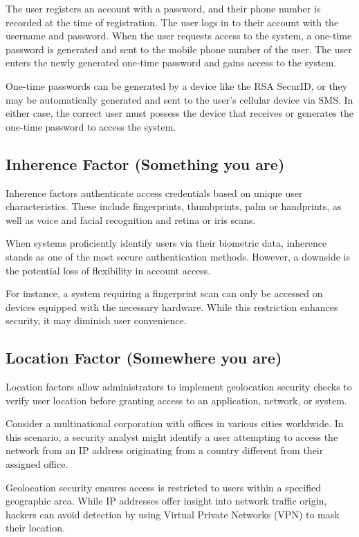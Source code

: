 The user registers an account with a password, and their phone number is recorded at the time of registration.
The user logs in to their account with the username and password.
When the user requests access to the system, a one-time password is generated and sent to the mobile phone number of the user.
The user enters the newly generated one-time password and gains access to the system.

One-time passwords can be generated by a device like the RSA SecurID, or they may be automatically generated and sent to the user's cellular device via SMS.
In either case, the correct user must possess the device that receives or generates the one-time password to access the system.

\newpage
\subsection{Inherence Factor (Something you are)}
Inherence factors authenticate access credentials based on unique user characteristics.
These include fingerprints, thumbprints, palm or handprints, as well as voice and facial recognition and retina or iris scans.

When systems proficiently identify users via their biometric data, inherence stands as one of the most secure authentication methods.
However, a downside is the potential loss of flexibility in account access.

For instance, a system requiring a fingerprint scan can only be accessed on devices equipped with the necessary hardware.
While this restriction enhances security, it may diminish user convenience. \cite{auth-factors-rublon}

\subsection{Location Factor (Somewhere you are)}
Location factors allow administrators to implement geolocation security checks to verify user location before granting access to an application, network, or system.

Consider a multinational corporation with offices in various cities worldwide.
In this scenario, a security analyst might identify a user attempting to access the network from an IP address originating from a country different from their assigned office.

Geolocation security ensures access is restricted to users within a specified geographic area.
While IP addresses offer insight into network traffic origin, hackers can avoid detection by using Virtual Private Networks (VPN) to mask their location.


